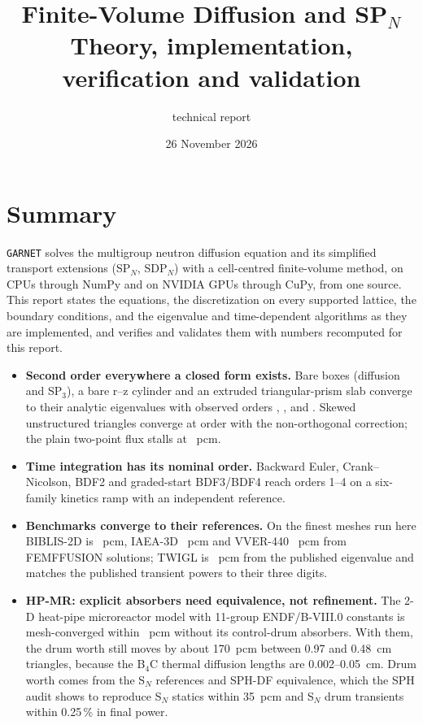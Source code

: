 \documentclass[a4paper,10pt]{article}
\title{\textbf{\garnet{} Finite-Volume Diffusion and SP$_N$}\\
\large Theory, implementation, verification and validation}
\author{\garnet{} technical report}
\date{26 November 2026}
\newcommand{\garnet}{\texttt{GARNET}}
\begin{document}
\sloppy
\maketitle

\section*{Summary}

\garnet{} solves the multigroup neutron diffusion equation and its simplified
transport extensions (SP$_N$, SDP$_N$) with a cell-centred finite-volume method,
on CPUs through NumPy and on NVIDIA GPUs through CuPy, from one source. This
report states the equations, the discretization on every supported lattice, the
boundary conditions, and the eigenvalue and time-dependent algorithms as they
are implemented, and verifies and validates them with numbers recomputed for
this report.

\begin{itemize}
\item \textbf{Second order everywhere a closed form exists.} Bare boxes (diffusion
  and SP$_3$), a bare r--z cylinder and an extruded triangular-prism slab converge
  to their analytic eigenvalues with observed orders \boxOrder, \spOrder,
  \cylOrder{} and \prismOrder. Skewed unstructured triangles converge at order
  \skewOrder{} with the non-orthogonal correction; the plain two-point flux
  stalls at \skewUncorrected~pcm.
\item \textbf{Time integration has its nominal order.} Backward Euler, Crank--Nicolson,
  BDF2 and graded-start BDF3/BDF4 reach orders 1--4 on a six-family kinetics ramp
  with an independent reference.
\item \textbf{Benchmarks converge to their references.} On the finest meshes run
  here BIBLIS-2D is \biblisFine~pcm, IAEA-3D \iaeaFine~pcm and VVER-440
  \vverFine~pcm from FEMFFUSION solutions; TWIGL is \twiglFine~pcm from the
  published eigenvalue and matches the published transient powers to their three
  digits.
\item \textbf{HP-MR: explicit absorbers need equivalence, not refinement.} The 2-D
  heat-pipe microreactor model with 11-group ENDF/B-VIII.0 constants is
  mesh-converged within \noabsSpread~pcm without its control-drum absorbers. With
  them, the drum worth still moves by about 170~pcm between 0.97 and 0.48~cm
  triangles, because the B$_4$C thermal diffusion lengths are 0.002--0.05~cm. Drum
  worth comes from the S$_N$ references and SPH-DF equivalence, which the SPH audit
  shows to reproduce S$_N$ statics within 35~pcm and S$_N$ drum transients within
  0.25\,\% in final power.
\end{itemize}
\end{document}
